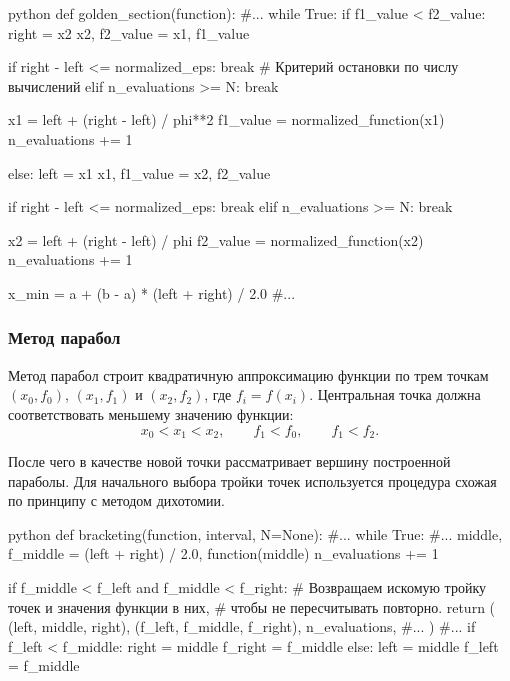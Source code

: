 \begin{mintedbox}{python}
    def golden_section(function):
        #...
        while True:
            if f1_value < f2_value:
                right = x2
                x2, f2_value = x1, f1_value

                if right - left <= normalized_eps:
                    break
                # Критерий остановки по числу вычислений
                elif n_evaluations >= N:
                    break

                x1 = left + (right - left) / phi**2
                f1_value = normalized_function(x1)
                n_evaluations += 1

            else:
                left = x1
                x1, f1_value = x2, f2_value

                if right - left <= normalized_eps:
                    break
                elif n_evaluations >= N:
                    break

                x2 = left + (right - left) / phi
                f2_value = normalized_function(x2)
                n_evaluations += 1

        x_min = a + (b - a) * (left + right) / 2.0
        #...
\end{mintedbox}

\newpage

\subsubsection{Метод парабол}

Метод парабол строит квадратичную аппроксимацию функции по трем точкам
\((x_0, f_0)\), \((x_1, f_1)\) и \((x_2, f_2)\), где
\(f_i = f(x_i)\). Центральная точка должна соответствовать меньшему
значению функции:
\[
x_0 < x_1 < x_2, \qquad f_1 < f_0, \qquad f_1 < f_2.
\]

После чего в качестве новой точки
рассматривает вершину построенной параболы. Для начального выбора тройки точек
используется процедура схожая по принципу с методом дихотомии.

\begin{mintedbox}{python}
    def bracketing(function, interval, N=None):
        #...
        while True:
            #...
            middle, f_middle = (left + right) / 2.0, function(middle)
            n_evaluations += 1

            if f_middle < f_left and f_middle < f_right:
                # Возвращаем искомую тройку точек и значения функции в них,
                # чтобы не пересчитывать повторно.
                return (
                    (left, middle, right),
                    (f_left, f_middle, f_right),
                    n_evaluations,
                    #...
                )
            #...
            if f_left < f_middle:
                right = middle
                f_right = f_middle
            else:
                left = middle
                f_left = f_middle
\end{mintedbox}

